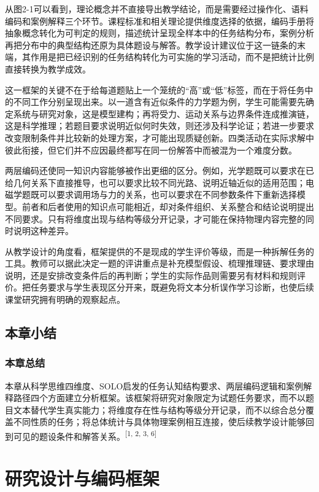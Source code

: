 \documentclass[
  12pt,
  a4paper]{ctexbook}
\begin{document}
从图2-1可以看到，理论概念并不直接导出教学结论，而是需要经过操作化、语料编码和案例解释三个环节。课程标准和相关理论提供维度选择的依据，编码手册将抽象概念转化为可判定的规则，描述统计呈现全样本中的任务结构分布，案例分析再把分布中的典型结构还原为具体题设与解答。教学设计建议位于这一链条的末端，其作用是把已经识别的任务结构转化为可实施的学习活动，而不是把统计比例直接转换为教学成效。

这一框架的关键不在于给每道题贴上一个笼统的``高''或``低''标签，而在于将任务中的不同工作分别呈现出来。以一道含有近似条件的力学题为例，学生可能需要先确定系统与研究对象，这是模型建构；再将受力、运动关系与边界条件连成推演链，这是科学推理；若题目要求说明近似何时失效，则还涉及科学论证；若进一步要求改变限制条件并比较新的处理方案，才可能出现质疑创新。四类活动在实际求解中彼此衔接，但它们并不应因最终都写在同一份解答中而被混为一个难度分数。

两层编码还使同一知识内容能够被作出更细的区分。例如，光学题既可以要求在已给几何关系下直接推导，也可以要求比较不同光路、说明近轴近似的适用范围；电磁学题既可以要求调用场与力的关系，也可以要求在不同参数条件下重新选择模型。前者和后者使用的知识点可能相近，却对条件组织、关系整合和结论说明提出不同要求。只有将维度出现与结构等级分开记录，才可能在保持物理内容完整的同时说明这种差异。

从教学设计的角度看，框架提供的不是现成的学生评价等级，而是一种拆解任务的工具。教师可以据此决定一题的评讲重点是补充模型假设、梳理推理链、要求理由说明，还是安排改变条件后的再判断；学生的实际作品则需要另有材料和规则评价。把任务要求与学生表现区分开来，既避免将文本分析误作学习诊断，也使后续课堂研究拥有明确的观察起点。

\section{本章小结}\label{ux672cux7ae0ux5c0fux7ed3-1}

\subsection{本章总结}\label{ux672cux7ae0ux603bux7ed3-1}

本章从科学思维四维度、SOLO启发的任务认知结构要求、两层编码逻辑和案例解释路径四个方面建立分析框架。该框架将研究对象限定为试题任务要求，而不以题目文本替代学生真实能力；将维度存在性与结构等级分开记录，而不以综合总分覆盖不同性质的任务；将总体统计与具体物理案例相互连接，使后续教学设计能够回到可见的题设条件和解答关系。\textsuperscript{[1, 2, 3, 6]}

\chapter{研究设计与编码框架}\label{ux7814ux7a76ux8bbeux8ba1ux4e0eux7f16ux7801ux6846ux67b6}
\end{document}
